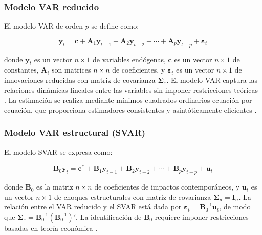 \documentclass[12pt,a4paper]{article}
\begin{document}
\subsubsection{Modelo VAR reducido}

El modelo VAR de orden $p$ se define como:

\begin{equation}
\mathbf{y}_t = \mathbf{c} + \mathbf{A}_1 \mathbf{y}_{t-1} + \mathbf{A}_2 \mathbf{y}_{t-2} + \cdots + \mathbf{A}_p \mathbf{y}_{t-p} + \boldsymbol{\varepsilon}_t
\label{eq:var}
\end{equation}

donde $\mathbf{y}_t$ es un vector $n \times 1$ de variables endógenas, $\mathbf{c}$ es un vector $n \times 1$ de constantes, $\mathbf{A}_i$ son matrices $n \times n$ de coeficientes, y $\boldsymbol{\varepsilon}_t$ es un vector $n \times 1$ de innovaciones reducidas con matriz de covarianza $\boldsymbol{\Sigma}_\varepsilon$. El modelo VAR captura las relaciones dinámicas lineales entre las variables sin imponer restricciones teóricas \citep{sims1980}. La estimación se realiza mediante mínimos cuadrados ordinarios ecuación por ecuación, que proporciona estimadores consistentes y asintóticamente eficientes \citep{hamilton1994, lutkepohl2005}.

\subsubsection{Modelo VAR estructural (SVAR)}

El modelo SVAR se expresa como:

\begin{equation}
\mathbf{B}_0 \mathbf{y}_t = \mathbf{c}^* + \mathbf{B}_1 \mathbf{y}_{t-1} + \mathbf{B}_2 \mathbf{y}_{t-2} + \cdots + \mathbf{B}_p \mathbf{y}_{t-p} + \mathbf{u}_t
\label{eq:svar}
\end{equation}

donde $\mathbf{B}_0$ es la matriz $n \times n$ de coeficientes de impactos contemporáneos, y $\mathbf{u}_t$ es un vector $n \times 1$ de choques estructurales con matriz de covarianza $\boldsymbol{\Sigma}_u = \mathbf{I}_n$. La relación entre el VAR reducido y el SVAR está dada por $\boldsymbol{\varepsilon}_t = \mathbf{B}_0^{-1} \mathbf{u}_t$, de modo que $\boldsymbol{\Sigma}_\varepsilon = \mathbf{B}_0^{-1} (\mathbf{B}_0^{-1})'$. La identificación de $\mathbf{B}_0$ requiere imponer restricciones basadas en teoría económica \citep{blanchard1989, bernanke1986, favero2001}.
\end{document}
